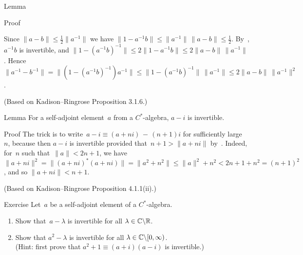 \documentclass[a]{subfiles}
\begin{document}
\begin{parsec}
\begin{point}{Lemma}
\begin{point}{Proof}
\begin{point}
Since $\|a-b\|\leq \frac{1}{2}\|a^{-1}\|$
we have
$\|1-a^{-1}b\|\leq \|a^{-1}\|\,\|a-b\|\leq \frac{1}{2}$.
By~, $a^{-1}b$ is invertible,
and $\|1-(a^{-1}b)^{-1}\|\leq 2\|1-a^{-1}b\|\leq 2\|a-b\|\,\|a^{-1}\|$.
Hence $\|a^{-1}-b^{-1}\| = \|(1-(a^{-1}b)^{-1})a^{-1}\|
\leq \|1-(a^{-1}b)^{-1}\|\,\|a^{-1}\|\leq 2 \|a-b\|\,\|a^{-1}\|^2$.

(Based on Kadison--Ringrose Proposition 3.1.6.)
\end{point}
\end{point}
\end{point}
%
%
\begin{point}{Lemma}%
For a self-adjoint element~$a$ from a $C^*$-algebra,
$a-i$ is invertible.
\begin{point}{Proof}%
The trick
is to 
write~$a-i\equiv (a+ni)\,-\,(n+1)i$
for sufficiently large~$n$,
because  
then
$a-i$
is invertible provided that~$n+1 > \|a+ni\|$
by~.
Indeed, for~$n$ such that~$\|a\|<2n+1$,
we have $\|a+ni\|^2 = \|(a+ni)^*(a+ni)\|
= \|a^2+n^2\|
\leq \|a\|^2+n^2 < 2n+1+n^2 = (n+1)^2$,
and so $\|a+ni\| < n+1$.

(Based on Kadison--Ringrose Proposition 4.1.1(ii).)
\end{point}
\begin{point}{Exercise}%
Let~$a$ be a self-adjoint element of a $C^*$-algebra.
\begin{enumerate}
\item
Show that~$a-\lambda$ is invertible for all $\lambda\in \mathbb{C}\backslash \mathbb{R}$.
\item
Show that $a^2-\lambda$ is invertible for all 
$\lambda\in \mathbb{C}\backslash[0,\infty)$.\\
(Hint: first prove that
 $a^2+1 \equiv (a+i)(a-i)$ is invertible.)


\end{enumerate}
\end{point}
\end{point}
\end{parsec}
\end{document}
